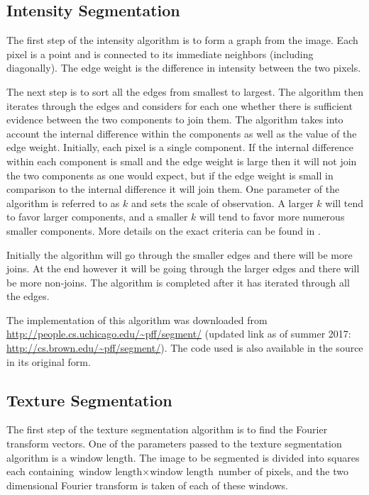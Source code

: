 \documentclass[twocolumn]{article}
\begin{document}
\subsection{Intensity Segmentation}

The first step of the intensity algorithm \cite{intensity} 
is to form a graph from the image. Each pixel is a point and is 
connected to its immediate neighbors (including diagonally). 
The edge weight is the difference in intensity between the two
pixels. 

The next step is to sort all the edges from smallest to largest. The
algorithm then iterates through the edges and considers for each one
whether there is sufficient evidence between the two components to
join them. The algorithm takes into account the internal difference
within the components as well as the value of the edge
weight. Initially, each pixel is a single component. If the internal
difference within each component is small and the edge weight is large
then it will not join the two components as one would expect, but if
the edge weight is small in comparison to the internal difference it
will join them. One parameter of the algorithm is referred to as $k$
and sets the scale of observation. A larger $k$ will tend to favor
larger components, and a smaller $k$ will tend to favor more numerous
smaller components. More details on the exact criteria can be found in
\cite{intensity}.

Initially the algorithm will go through the smaller edges and there
will be more joins. At the end however it will be going through the
larger edges and there will be more non-joins. The algorithm is
completed after it has iterated through all the edges. 

The implementation of this algorithm was downloaded from 
\url{http://people.cs.uchicago.edu/~pff/segment/} (updated link
as of summer 2017: \url{http://cs.brown.edu/~pff/segment/}). 
The code used is also available in the source in its original
form.

\subsection{Texture Segmentation}

The first step of the texture segmentation algorithm is to find the
Fourier transform vectors. One of the parameters passed to the texture
segmentation algorithm is a window length. The image to be segmented
is divided into squares each containing 
$\mbox{window length} \times \mbox{window length}$ 
number of pixels, and the two dimensional Fourier
transform is taken of each of these windows. 
\end{document}
